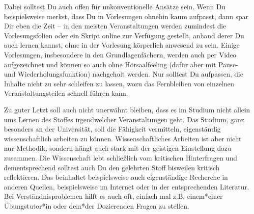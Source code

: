 {    Dabei solltest Du auch offen für unkonventionelle Ansätze sein. Wenn Du beispielsweise merkst, dass Du in Vorlesungen ohnehin kaum aufpasst, dann spar Dir eben die Zeit – in den meisten Veranstaltungen werden zumindest die Vorlesungsfolien oder ein Skript online zur Verfügung gestellt, anhand derer Du auch lernen kannst, ohne in der Vorlesung körperlich anwesend zu sein. Einige Vorlesungen, insbesondere in den Grundlagenfächern, werden auch per Video aufgezeichnet und können so auch ohne Hörsaalfeeling (dafür aber mit Pause- und Wiederholungsfunktion) nachgeholt werden. Nur solltest Du aufpassen, die Inhalte nicht zu sehr schleifen zu lassen, wozu das Fernbleiben von einzelnen Veranstaltungsteilen schnell führen kann.

    Zu guter Letzt soll auch nicht unerwähnt bleiben, dass es im Studium nicht allein ums Lernen des Stoffes irgendwelcher Veranstaltungen geht. Das Studium, ganz besonders an der Universität, soll die Fähigkeit vermitteln, eigenständig wissenschaftlich arbeiten zu können. Wissenschaftliches Arbeiten ist aber nicht nur Methodik, sondern hängt auch stark mit der geistigen Einstellung dazu zusammen. Die Wissenschaft lebt schließlich vom kritischen Hinterfragen und dementsprechend solltest auch Du den gelehrten Stoff bisweilen kritisch reflektieren. Das beinhaltet beispielsweise auch eigenständige Recherche in anderen Quellen, beispielsweise im Internet oder in der entsprechenden Literatur. Bei Verständnisproblemen hilft es auch oft, einfach mal z.B. einem*einer Übungstutor*in oder dem*der Dozierenden Fragen zu stellen.
}
{}

\vfill
{}

\newpage
